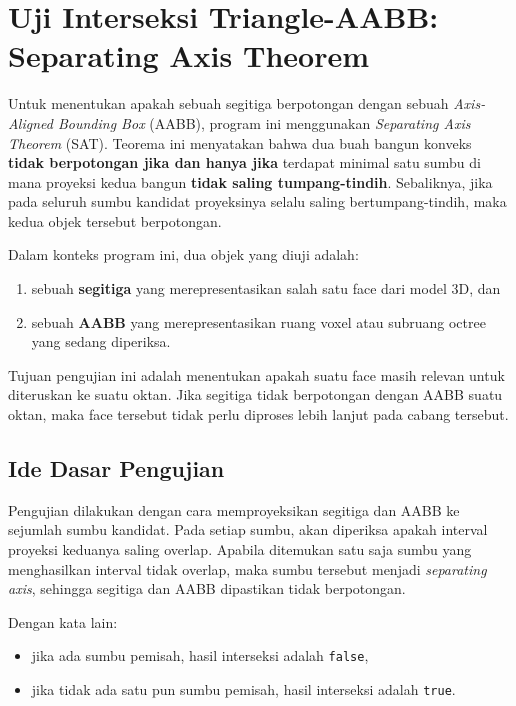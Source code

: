 \documentclass[12pt, a4paper]{report}
\begin{document}
\section{Uji Interseksi Triangle-AABB: Separating Axis Theorem}

Untuk menentukan apakah sebuah segitiga berpotongan dengan sebuah
\textit{Axis-Aligned Bounding Box} (AABB), program ini menggunakan
\textit{Separating Axis Theorem} (SAT). Teorema ini menyatakan bahwa dua
buah bangun konveks \textbf{tidak berpotongan jika dan hanya jika}
terdapat minimal satu sumbu di mana proyeksi kedua bangun \textbf{tidak
saling tumpang-tindih}. Sebaliknya, jika pada seluruh sumbu kandidat
proyeksinya selalu saling bertumpang-tindih, maka kedua objek tersebut
berpotongan.

Dalam konteks program ini, dua objek yang diuji adalah:
\begin{enumerate}
  \item sebuah \textbf{segitiga} yang merepresentasikan salah satu face
  dari model 3D, dan
  \item sebuah \textbf{AABB} yang merepresentasikan ruang voxel atau
  subruang octree yang sedang diperiksa.
\end{enumerate}

Tujuan pengujian ini adalah menentukan apakah suatu face masih relevan
untuk diteruskan ke suatu oktan. Jika segitiga tidak berpotongan dengan
AABB suatu oktan, maka face tersebut tidak perlu diproses lebih lanjut
pada cabang tersebut.

\subsection{Ide Dasar Pengujian}

Pengujian dilakukan dengan cara memproyeksikan segitiga dan AABB ke
sejumlah sumbu kandidat. Pada setiap sumbu, akan diperiksa apakah
interval proyeksi keduanya saling overlap. Apabila ditemukan satu saja
sumbu yang menghasilkan interval tidak overlap, maka sumbu tersebut
menjadi \textit{separating axis}, sehingga segitiga dan AABB dipastikan
tidak berpotongan.

Dengan kata lain:
\begin{itemize}
  \item jika ada sumbu pemisah, hasil interseksi adalah \texttt{false},
  \item jika tidak ada satu pun sumbu pemisah, hasil interseksi adalah
  \texttt{true}.
\end{itemize}
\end{document}
